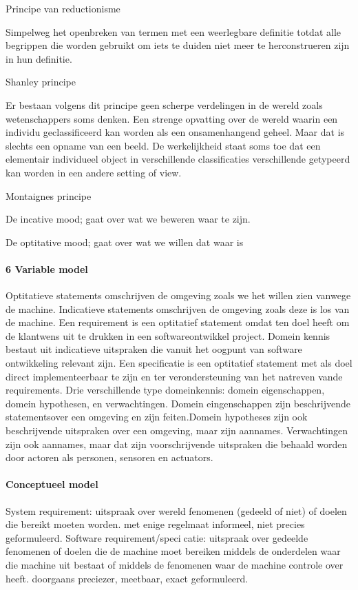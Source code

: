 Principe van reductionisme 

Simpelweg het openbreken van termen met een weerlegbare definitie totdat alle begrippen die worden gebruikt om iets te duiden  niet meer te herconstrueren zijn in hun definitie. 

Shanley principe 

Er bestaan volgens dit principe geen scherpe verdelingen in de wereld zoals wetenschappers soms denken. Een strenge opvatting over de wereld waarin een individu geclassificeerd kan worden als een onsamenhangend geheel. Maar dat is slechts een opname van een beeld. De werkelijkheid staat soms toe dat een elementair individueel object in verschillende classificaties verschillende getypeerd kan worden in een andere setting of view. 

Montaignes principe 

De incative mood; gaat over wat we beweren waar te zijn. 

De optitative mood; gaat over wat we willen dat waar is 


\paragraph{6 Variable model}
Optitatieve statements omschrijven de omgeving zoals we het willen zien vanwege de machine. 
Indicatieve statements omschrijven de omgeving zoals deze is los van de machine. 
Een requirement is een optitatief statement omdat ten doel heeft om de klantwens uit te drukken in een softwareontwikkel project. 
Domein kennis bestaut uit indicatieve uitspraken die vanuit het oogpunt van software ontwikkeling relevant zijn. 
Een specificatie is een optitatief statement met als doel direct implementeerbaar te zijn en ter verondersteuning van het natreven vande requirements. 
Drie verschillende type domeinkennis: domein eigenschappen, domein hypothesen, en verwachtingen. 
Domein eingenschappen  zijn beschrijvende statementsover een omgeving en zijn feiten.Domein hypotheses  zijn ook beschrijvende uitspraken over een omgeving, maar zijn aannames. 
Verwachtingen zijn ook aannames, maar dat zijn voorschrijvende uitspraken die behaald worden door actoren als personen, sensoren en actuators. 

  
\paragraph{Conceptueel model}



System requirement:
uitspraak over wereld fenomenen (gedeeld of niet) of doelen
die bereikt moeten worden.
met enige regelmaat informeel, niet precies geformuleerd.
Software requirement/specicatie:
uitspraak over gedeelde fenomenen of doelen die de machine
moet bereiken middels de onderdelen waar die machine uit
bestaat of middels de fenomenen waar de machine controle
over heeft.
doorgaans preciezer, meetbaar, exact geformuleerd.


